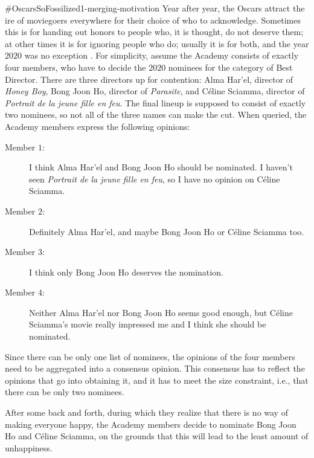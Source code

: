 \begin{xmpl}{$\#$OscarsSoFossilized}{1-merging-motivation}
	Year after year, the Oscars attract the ire of moviegoers everywhere 
	for their choice of who to acknowledge. 
	Sometimes this is for handing out honors
	to people who, it is thought, do not deserve them; 
	at other times it is for ignoring people who do; 
	usually it is for both, and the year $2020$ was no exception \cite{Brody20}.
	For simplicity, assume the Academy consists of exactly four members, 
	who have to decide the $2020$ nominees for the category of Best Director.
	There are three directors up for contention:
	Alma Har'el, director of \emph{Honey Boy}, 
	Bong Joon Ho, director of \emph{Parasite}, 
	and C\'eline Sciamma, director of \emph{Portrait de la jeune fille en feu}. 
	The final lineup is supposed to consist of exactly two nominees,
	so not all of the three names can make the cut.
	When queried, the Academy members express the following opinions:
	\begin{description}
		\item[Member $1$:] I think Alma Har'el and Bong Joon Ho should be nominated. 
			I haven't seen \emph{Portrait de la jeune fille en feu}, so I have no opinion
			on C\'eline Sciamma.
		\item[Member $2$:] Definitely Alma Har'el, and maybe Bong Joon Ho or C\'eline Sciamma too.
		\item[Member $3$:] I think only Bong Joon Ho deserves the nomination.
		\item[Member $4$:] Neither Alma Har'el nor Bong Joon Ho seems good enough,
			but C\'eline Sciamma's movie really impressed me and I think she should be nominated.
	\end{description}
	Since there can be only one list of nominees,
	the opinions of the four members need to be aggregated into a consensus opinion.
	This consensus has to reflect the opinions that go into obtaining it,
	and it has to meet the size constraint, i.e., that there can be only two nominees.

	After some back and forth,
	during which they realize that
	there is no way of making everyone happy,
	the Academy members decide to nominate 
	Bong Joon Ho and C\'eline Sciamma,
	on the grounds that this 
	will lead to the least amount of
	unhappiness.
\end{xmpl}

